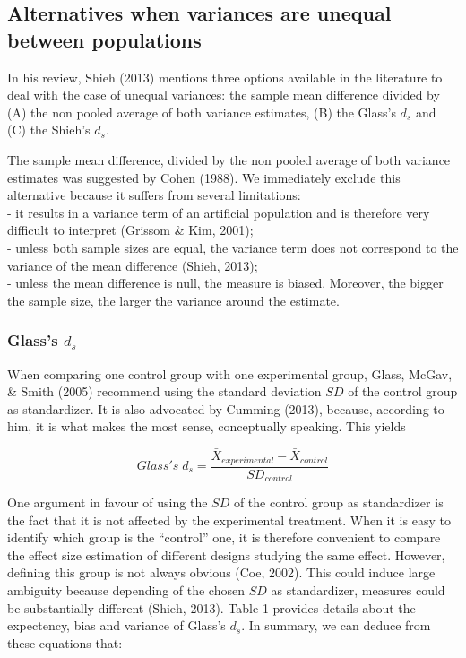 \documentclass[
  man,floatsintext]{apa6}
\begin{document}
\newpage

\hypertarget{alternatives-when-variances-are-unequal-between-populations}{%
\subsection{Alternatives when variances are unequal between populations}\label{alternatives-when-variances-are-unequal-between-populations}}

In his review, Shieh (2013) mentions three options available in the literature to deal with the case of unequal variances: the sample mean difference divided by (A) the non pooled average of both variance estimates, (B) the Glass's \(d_s\) and (C) the Shieh's \(d_s\).

The sample mean difference, divided by the non pooled average of both variance estimates was suggested by Cohen (1988). We immediately exclude this alternative because it suffers from several limitations:\\
- it results in a variance term of an artificial population and is therefore very difficult to interpret (Grissom \& Kim, 2001);\\
- unless both sample sizes are equal, the variance term does not correspond to the variance of the mean difference (Shieh, 2013);\\
- unless the mean difference is null, the measure is biased. Moreover, the bigger the sample size, the larger the variance around the estimate.

\hypertarget{glasss-d_s}{%
\subsubsection{\texorpdfstring{Glass's \(d_s\)}{Glass's d\_s}}\label{glasss-d_s}}

When comparing one control group with one experimental group, Glass, McGav, \& Smith (2005) recommend using the standard deviation \(SD\) of the control group as standardizer. It is also advocated by Cumming (2013), because, according to him, it is what makes the most sense, conceptually speaking. This yields

\begin{equation} 
Glass's \; d_s = \frac{\bar{X}_{experimental} - \bar{X}_{control}}{SD_{control}}
\label{eq:Glassds}
\end{equation}

One argument in favour of using the \(SD\) of the control group as standardizer is the fact that it is not affected by the experimental treatment. When it is easy to identify which group is the \enquote{control} one, it is therefore convenient to compare the effect size estimation of different designs studying the same effect. However, defining this group is not always obvious (Coe, 2002). This could induce large ambiguity because depending of the chosen \(SD\) as standardizer, measures could be substantially diﬀerent (Shieh, 2013). Table 1 provides details about the expectency, bias and variance of Glass's \(d_s\). In summary, we can deduce from these equations that:
\end{document}
